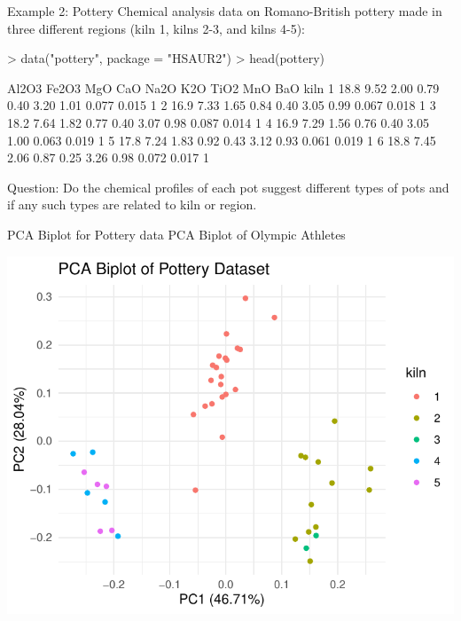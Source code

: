 \documentclass[11pt,handout,aspectratio=169]{beamer}
\begin{document}
\begin{frame}[fragile]{Example 2: Pottery}
Chemical analysis data on Romano-British pottery made in three different regions (kiln 1, kilns 2-3, and kilns 4-5):{\scriptsize
\begin{Schunk}
\begin{Sinput}
> data("pottery", package = "HSAUR2")
> head(pottery)
\end{Sinput}
\begin{Soutput}
  Al2O3 Fe2O3  MgO  CaO Na2O  K2O TiO2   MnO   BaO kiln
1  18.8  9.52 2.00 0.79 0.40 3.20 1.01 0.077 0.015    1
2  16.9  7.33 1.65 0.84 0.40 3.05 0.99 0.067 0.018    1
3  18.2  7.64 1.82 0.77 0.40 3.07 0.98 0.087 0.014    1
4  16.9  7.29 1.56 0.76 0.40 3.05 1.00 0.063 0.019    1
5  17.8  7.24 1.83 0.92 0.43 3.12 0.93 0.061 0.019    1
6  18.8  7.45 2.06 0.87 0.25 3.26 0.98 0.072 0.017    1
\end{Soutput}
\end{Schunk}
}
Question: Do the chemical profiles of each pot suggest different types of pots and if any such types are related to kiln or region.
\end{frame}


\begin{frame}[fragile]{PCA Biplot for Pottery data}
PCA Biplot of Olympic Athletes	{\scriptsize
\begin{center}
\includegraphics[width=.6\textwidth]{pics/plot4.2.pdf}		
\end{center}}
\end{frame}
\end{document}
